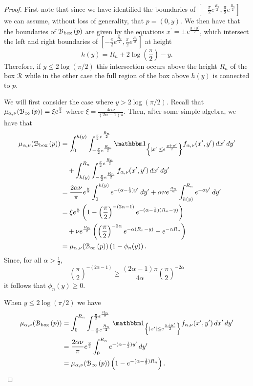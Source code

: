 \begin{proof}
First note that since we have identified the boundaries of $[-\frac{\pi}{2}e^{\frac{R_n}{2}}, \frac{\pi}{2}e^{\frac{R_n}{2}}]$ we can assume, without loss of generality, that $p = (0,y)$. We then have that the boundaries of ${\mathcal B}_{\text{box}}\left(p\right)$ are given by the equations $x^\prime = \pm e^{\frac{y+y^\prime}{2}}$, which intersect the left and right boundaries of $[-\frac{\pi}{2}e^{\frac{R_n}{2}}, \frac{\pi}{2}e^{\frac{R_n}{2}}]$ at height
\[
	h(y) = R_n + 2 \log\left(\frac{\pi}{2}\right) - y.
\]
Therefore, if $y \le 2 \log(\pi/2)$ this intersection occurs above the height $R_n$ of the box ${\mathcal R}$ while in the other case the full region of the box above $h(y)$ is connected to $p$. 

We will first consider the case where $y > 2 \log(\pi/2)$. Recall that $\mu_{\alpha,\nu}({\mathcal B}_{\infty}\left(p\right)) = \xi e^{\frac{y}{2}}$ where $\xi = \frac{4\alpha \nu}{(2\alpha - 1)\pi}$. Then, after some simple algebra, we have that
\begin{align*}
	\mu_{\alpha,\nu}(\BallPon{p})
	&= \int_0^{h(y)} \int_{-\frac{\pi}{2}e^{\frac{R_n}{2}}}^{\frac{\pi}{2}e^{\frac{R_n}{2}}} 
		\ind{|x^\prime| \le e^{\frac{y+y^\prime}{2}}} f_{\alpha,\nu}(x^\prime,y^\prime) \, dx^\prime \, dy^\prime\\
	&\hspace{10pt}+ \int_{h(y)}^{R_n} \int_{-\frac{\pi}{2}e^{\frac{R_n}{2}}}^{\frac{\pi}{2}e^{\frac{R_n}{2}}} 
		f_{\alpha,\nu}(x^\prime,y^\prime) \, dx^\prime \, dy^\prime\\
	&= \frac{2 \alpha \nu}{\pi} e^{\frac{y}{2}} \int_0^{h(y)} e^{-(\alpha - \frac{1}{2})y^\prime} \, dy^\prime
		+ \alpha \nu e^{\frac{R_n}{2}} \int_{h(y)}^{R_n} e^{-\alpha y^\prime} \, dy^\prime \\
	&= \xi e^{\frac{y}{2}}\left(1 - \left(\frac{\pi}{2}\right)^{-(2\alpha - 1)} 
		e^{-(\alpha - \frac{1}{2})(R_n - y)}\right)\\
	&\hspace{10pt}+ \nu e^{\frac{R_n}{2}}\left(\left(\frac{\pi}{2}\right)^{-2\alpha} e^{-\alpha(R_n - y)} 
		- e^{-\alpha R_n}\right)\\
	&= \mu_{\alpha,\nu}(\BallPo{p})\left(1 - \phi_n(y)\right).
\end{align*}
Since, for all $\alpha > \frac{1}{2}$,
\[
	\left(\frac{\pi}{2}\right)^{-(2\alpha - 1)} \ge \frac{(2\alpha - 1)\pi}{4\alpha} \left(\frac{\pi}{2}\right)^{-2\alpha}
\]
it follows that $\phi_n(y) \ge 0$.

When $y \le 2 \log(\pi/2)$ we have
\begin{align*}
	\mu_{\alpha,\nu}(\BallPon{p})
	&= \int_0^{R_n} \int_{-\frac{\pi}{2}e^{\frac{R_n}{2}}}^{\frac{\pi}{2}e^{\frac{R_n}{2}}} 
		\ind{|x^\prime| \le e^{\frac{y+y^\prime}{2}}} f_{\alpha,\nu}(x^\prime,y^\prime) \, dx^\prime \, dy^\prime\\
	&= \frac{2 \alpha \nu}{\pi} e^{\frac{y}{2}} \int_0^{R_n} e^{-(\alpha - \frac{1}{2})y^\prime} \, dy^\prime\\
	&= \mu_{\alpha,\nu}(\BallPo{p})\left(1 - e^{-(\alpha - \frac{1}{2})R_n}\right).
\end{align*}
\end{proof}

